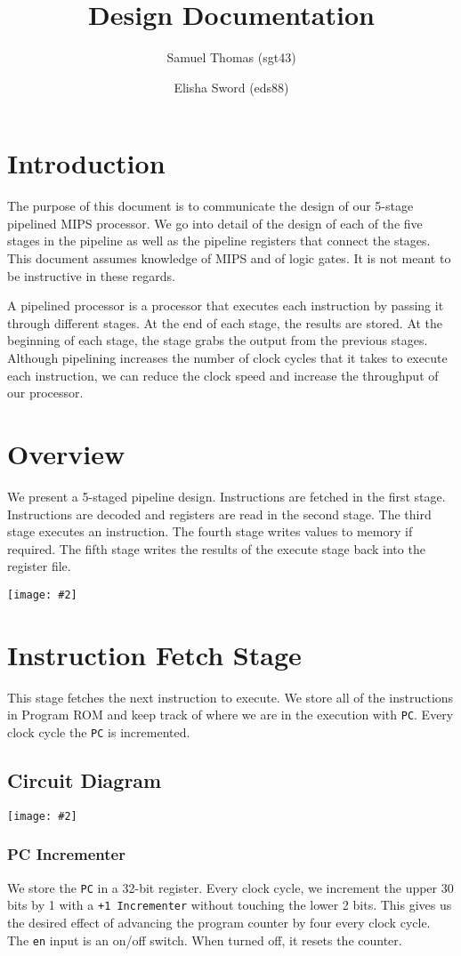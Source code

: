 \documentclass[10pt]{article}
\title{Design Documentation}
\author{Samuel Thomas (sgt43) \and Elisha Sword (eds88)}
\newcommand{\diagram}[2][1]{\begin{center}\texttt{[image: \#2]}\end{center}}
\begin{document}
\maketitle

\section{Introduction}
The purpose of this document is to communicate the design of our 5-stage pipelined MIPS processor. 
We go into detail of the design of each of the five stages in the pipeline as well as the pipeline registers that connect the stages.
This document assumes knowledge of MIPS and of logic gates. It is not meant to be instructive in these regards. 

A pipelined processor is a processor that executes each instruction by passing it through different stages. At the end of each stage, the results are stored.
At the beginning of each stage, the stage grabs the output from the previous stages. Although pipelining increases the number of clock cycles
that it takes to execute each instruction, we can reduce the clock speed and increase the throughput of our processor.

\section{Overview}
We present a 5-staged pipeline design. Instructions are fetched in the first stage. Instructions are decoded and registers are read in the second stage.
The third stage executes an instruction. The fourth stage writes values to memory if required.
The fifth stage writes the results of the execute stage back into the register file.
\diagram{overview}

\section{Instruction Fetch Stage}
This stage fetches the next instruction to execute. We store all of the instructions in Program ROM and keep track of where we are in the execution with \texttt{PC}.
Every clock cycle the \texttt{PC} is incremented.

\subsection{Circuit Diagram}
\diagram[0.8]{fetch}
\subsubsection{PC Incrementer}
We store the \texttt{PC} in a 32-bit register. Every clock cycle, we increment the upper 30 bits by 1 with a \texttt{+1 Incrementer} without touching the lower 2 bits.
This gives us the desired effect of advancing the program counter by four every clock cycle.
The \texttt{en} input is an on/off switch. When turned off, it resets the counter. 
\end{document}
